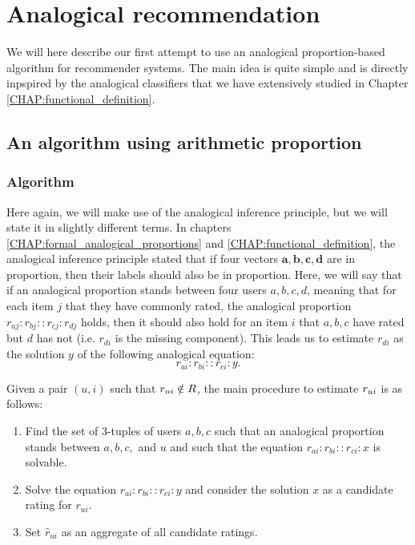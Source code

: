 \chapter{Analogical recommendation}
\label{CHAP:analogical_recommendation}

We will here describe our first attempt to use an analogical proportion-based
algorithm for recommender systems. The main idea is quite simple and is
directly inpspired by the analogical classifiers that we have extensively
studied in Chapter \ref{CHAP:functional_definition}.

\section{An algorithm using arithmetic proportion}
\subsection{Algorithm}

Here again, we will make use of the analogical inference principle, but we will
state it in slightly different terms. In chapters
\ref{CHAP:formal_analogical_proportions} and \ref{CHAP:functional_definition},
the analogical inference principle stated that if four vectors $\mathbf{a},
\mathbf{b}, \mathbf{c}, \mathbf{d}$ are in proportion, then their labels should
also be in proportion.  Here, we will say that if an analogical proportion
stands between four users $a, b, c, d$, meaning that for each item $j$ that
they have commonly rated, the analogical proportion $r_{aj} : r_{bj} :: r_{cj}
: r_{dj}$ holds, then it should also hold for an item $i$ that $a, b, c$ have
rated but $d$ has not (i.e. $r_{di}$ is the missing component). This leads us
to estimate $r_{di}$ as the solution $y$ of the following analogical
equation: $$r_{ai} : r_{bi} :: r_{ci} : y.$$
\noindent

Given a pair $(u,i)$ such that $r_{ui} \notin R$, the main procedure to
estimate $r_{ui}$ is as follows:
\begin{enumerate}
\item Find the set of 3-tuples of users $a, b, c$ such that an analogical
  proportion stands between $a, b, c,$ and $u$ and such that the equation
    $r_{ai} : r_{bi} :: r_{ci} : x$ is solvable.
\item Solve the equation $r_{ai} : r_{bi} :: r_{ci} : y$ and consider the
  solution $x$ as a candidate rating for $r_{ui}$.
\item Set $\hat{r}_{ui}$ as an aggregate of all candidate ratings.
\end{enumerate}

